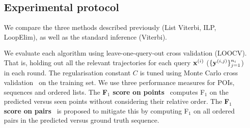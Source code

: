\begin{table}[t]
	\begin{minipage}[t]{\linewidth}
		\label{tab:data}
	\end{minipage}
\end{table}

%
\subsection{Experimental protocol}

We compare the three methods described previously ({\sc List Viterbi}, {\sc ILP}, {\sc LoopElim}),
as well as the standard inference ({\sc Viterbi}).

We evaluate each algorithm using leave-one-query-out cross validation (LOOCV).
That is, holding out all the relevant trajectories for each query $\mathbf{x}^{(i)}$ (\ie $\{\mathbf{y}^{(i,j)}\}_{j=1}^{n_i}$) in each round.
The regularisation constant $C$ is tuned using Monte Carlo cross validation~\cite{burman1989comparative} on the training set.
We use three performance measures for POIs, sequences and ordered lists.
The {\bf F$_1$ score on points}~\cite{ijcai15} computes F$_1$ on the predicted versus seen points
without considering their relative order.
The {\bf F$_1$ score on pairs}~\cite{cikm16paper} is proposed to mitigate this by computing F$_1$ on all ordered pairs in the predicted versus ground truth sequence. %


